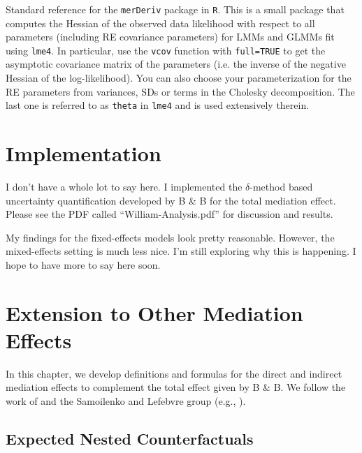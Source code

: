 \documentclass{report}
\begin{document}
\subsection{\citet{Wan18}}

Standard reference for the \texttt{merDeriv} package in \texttt{R}. This is a small package that computes the Hessian of the observed data likelihood with respect to all parameters (including RE covariance parameters) for LMMs and GLMMs fit using \texttt{lme4}. In particular, use the \texttt{vcov} function with \texttt{full=TRUE} to get the asymptotic covariance matrix of the parameters (i.e. the inverse of the negative Hessian of the log-likelihood). You can also choose your parameterization for the RE parameters from variances, SDs or terms in the Cholesky decomposition. The last one is referred to as \texttt{theta} in \texttt{lme4} and is used extensively therein.



\chapter{Implementation}

I don't have a whole lot to say here. I implemented the $\delta$-method based uncertainty quantification developed by B \& B for the total mediation effect. Please see the PDF called ``William-Analysis.pdf'' for discussion and results.

My findings for the fixed-effects models look pretty reasonable. However, the mixed-effects setting is much less nice. I'm still exploring why this is happening. I hope to have more to say here soon.



\chapter{Extension to Other Mediation Effects}

In this chapter, we develop definitions and formulas for the direct and indirect mediation effects to complement the total effect given by B \& B. We follow the work of \citet{Pea12} and the Samoilenko and Lefebvre group (e.g., \citealp{Sam23}). 

\section{Expected Nested Counterfactuals}
\label{sec:nest_CFs}
\end{document}
